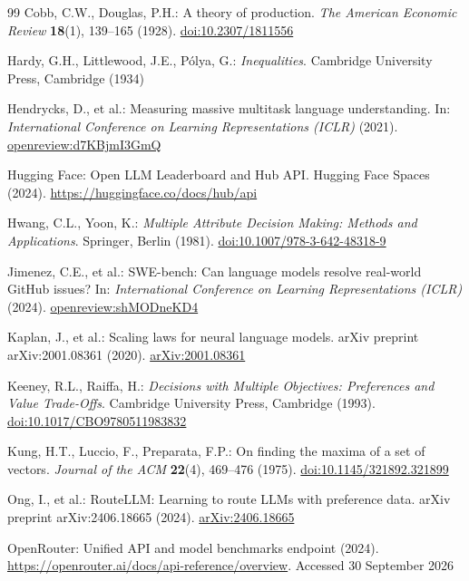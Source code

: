 \documentclass[pdflatex,sn-mathphys-num]{sn-jnl}
\theoremstyle{thmstyleone}
\theoremstyle{thmstylethree}
\begin{document}
\begin{thebibliography}{99}
Cobb, C.W., Douglas, P.H.: A theory of production. \emph{The American Economic Review} \textbf{18}(1), 139--165 (1928). \href{https://doi.org/10.2307/1811556}{doi:10.2307/1811556}

Hardy, G.H., Littlewood, J.E., P\'olya, G.: \emph{Inequalities}. Cambridge University Press, Cambridge (1934)

Hendrycks, D., et al.: Measuring massive multitask language understanding. In: \emph{International Conference on Learning Representations (ICLR)} (2021). \href{https://openreview.net/forum?id=d7KBjmI3GmQ}{openreview:d7KBjmI3GmQ}

Hugging Face: Open LLM Leaderboard and Hub API. Hugging Face Spaces (2024). \href{https://huggingface.co/docs/hub/api}{https://huggingface.co/docs/hub/api}

Hwang, C.L., Yoon, K.: \emph{Multiple Attribute Decision Making: Methods and Applications}. Springer, Berlin (1981). \href{https://doi.org/10.1007/978-3-642-48318-9}{doi:10.1007/978-3-642-48318-9}

Jimenez, C.E., et al.: SWE-bench: Can language models resolve real-world GitHub issues? In: \emph{International Conference on Learning Representations (ICLR)} (2024). \href{https://openreview.net/forum?id=shMODneKD4}{openreview:shMODneKD4}

Kaplan, J., et al.: Scaling laws for neural language models. arXiv preprint arXiv:2001.08361 (2020). \href{https://arxiv.org/abs/2001.08361}{arXiv:2001.08361}

Keeney, R.L., Raiffa, H.: \emph{Decisions with Multiple Objectives: Preferences and Value Trade-Offs}. Cambridge University Press, Cambridge (1993). \href{https://doi.org/10.1017/CBO9780511983832}{doi:10.1017/CBO9780511983832}

Kung, H.T., Luccio, F., Preparata, F.P.: On finding the maxima of a set of vectors. \emph{Journal of the ACM} \textbf{22}(4), 469--476 (1975). \href{https://doi.org/10.1145/321892.321899}{doi:10.1145/321892.321899}

Ong, I., et al.: RouteLLM: Learning to route LLMs with preference data. arXiv preprint arXiv:2406.18665 (2024). \href{https://arxiv.org/abs/2406.18665}{arXiv:2406.18665}

OpenRouter: Unified API and model benchmarks endpoint (2024). \href{https://openrouter.ai/docs/api-reference/overview}{https://openrouter.ai/docs/api-reference/overview}. Accessed 30 September 2026


\end{thebibliography}
\end{document}
